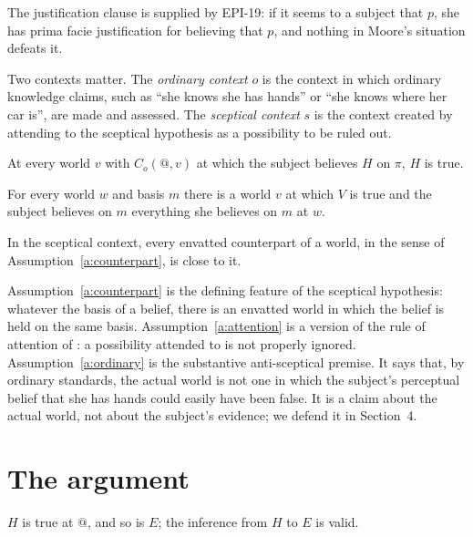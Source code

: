 \documentclass{situationist-preprint}
\begin{document}
The justification clause is supplied by EPI-19: if it seems to a subject that $p$, she has prima facie justification for believing that $p$, and nothing in Moore's situation defeats it.

Two contexts matter. The \emph{ordinary context} $o$ is the context in which ordinary knowledge claims, such as \enquote{she knows she has hands} or \enquote{she knows where her car is}, are made and assessed. The \emph{sceptical context} $s$ is the context created by attending to the sceptical hypothesis as a possibility to be ruled out.

\begin{assumption}\label{a:ordinary}
At every world $v$ with $C_o(@,v)$ at which the subject believes $H$ on $\pi$, $H$ is true.
\end{assumption}

\begin{assumption}\label{a:counterpart}
For every world $w$ and basis $m$ there is a world $v$ at which $V$ is true and the subject believes on $m$ everything she believes on $m$ at $w$.
\end{assumption}

\begin{assumption}[Attention]\label{a:attention}
In the sceptical context, every envatted counterpart of a world, in the sense of Assumption~\ref{a:counterpart}, is close to it.
\end{assumption}

Assumption~\ref{a:counterpart} is the defining feature of the sceptical hypothesis: whatever the basis of a belief, there is an envatted world in which the belief is held on the same basis. Assumption~\ref{a:attention} is a version of the rule of attention of \citet{Lewis1996}: a possibility attended to is not properly ignored. Assumption~\ref{a:ordinary} is the substantive anti-sceptical premise. It says that, by ordinary standards, the actual world is not one in which the subject's perceptual belief that she has hands could easily have been false. It is a claim about the actual world, not about the subject's evidence; we defend it in Section~4.

\section{The argument}

\begin{proposition}\label{p:sound}
$H$ is true at $@$, and so is $E$; the inference from $H$ to $E$ is valid.
\end{proposition}
\end{document}
